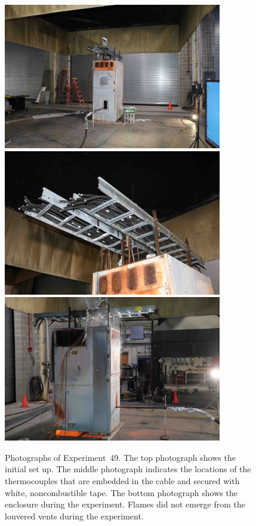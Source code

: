 \begin{figure}[p]
\centering
\includegraphics[height=2.50in]{../FIGURES/Test_49_setup} \\ \vspace{0.1in}
\includegraphics[height=2.50in]{../FIGURES/Test_49_cables} \\ \vspace{0.1in}
\includegraphics[height=2.50in]{../FIGURES/Test_49_fire}
\caption[Photographs of Experiment~49]{Photographs of Experiment~49. The top photograph shows the initial set up. The middle photograph indicates the locations of the thermocouples that are embedded in the cable and secured with white, noncombustible tape. The bottom photograph shows the enclosure during the experiment. Flames did not emerge from the louvered vents during the experiment. }
\label{fig:Test_49_photos}
\end{figure}


